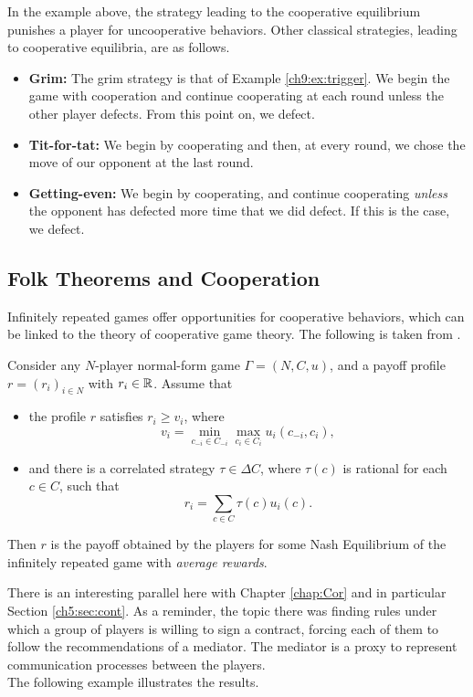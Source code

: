 In the example above, the strategy leading to the cooperative equilibrium punishes a player for uncooperative behaviors.
Other classical strategies, leading to cooperative equilibria, are as follows.
\begin{itemize}
\item \textbf{Grim:} The grim strategy is that of Example \ref{ch9:ex:trigger}. We begin the game with cooperation and continue cooperating at each round unless the other player defects. From this point on, we defect.
\item \textbf{Tit-for-tat:} We begin by cooperating and then, at every round, we chose the move of our opponent at the last round.
\item \textbf{Getting-even:} We begin by cooperating, and continue cooperating \emph{unless} the opponent has defected more time that we did defect. If this is the case, we defect.
\end{itemize}

\subsection{Folk Theorems and Cooperation}
Infinitely repeated games offer opportunities for cooperative behaviors, which can be linked to the theory of cooperative game theory.
The following is taken from  \cite[Theorem 6.15]{ShLeMSAG}.
\begin{theorem}
\label{ch9:thm:folk1}
Consider any $N$-player normal-form game $\Gamma = (N,C,u)$, and a payoff profile $r = (r_i)_{i \in N}$ with $r_i \in \mathbb{R}$.
Assume that
\begin{itemize}
\item the profile $r$ satisfies $r_i \geq v_i$, where
$$v_i = \min_{c_{-i} \in C_{-i}} \max_{c_i \in C_i} u_i(c_{-i}, c_i),$$
\item and there is a correlated strategy $\tau \in \Delta C$, where $\tau(c)$ is rational for each $c \in C$, such that
$$r_i = \sum_{c \in C} \tau(c) u_i(c).$$
\end{itemize}
Then $r$ is the payoff obtained by the players for some Nash Equilibrium of the infinitely repeated game with \emph{average rewards}.
\end{theorem}
There is an interesting parallel here with Chapter \ref{chap:Cor} and in particular Section \ref{ch5:sec:cont}.
As a reminder, the topic there was finding rules under which a group of players is willing to sign a contract, forcing each of them to follow the recommendations of a mediator.
The mediator is a proxy to represent communication processes between the players. \\
The following example illustrates the results.

